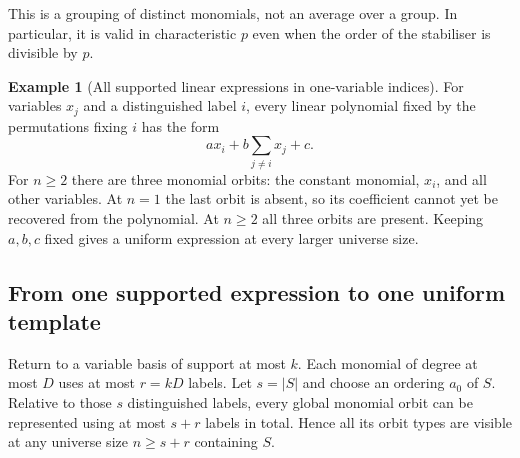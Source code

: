 \documentclass[11pt,a4paper,oneside,openany]{book}
\theoremstyle{definition}\newtheorem{definition}[theorem]{Definition}
\newtheorem{example}[theorem]{Example}
\theoremstyle{remark}\newtheorem{remark}[theorem]{Remark}
\numberwithin{equation}{chapter}
\begin{document}
This is a grouping of distinct monomials, not an average over a group.
In particular, it is valid in characteristic $p$ even when the order
of the stabiliser is divisible by $p$.

\begin{example}[All supported linear expressions in one-variable indices]\label{tx:eg:supported-linear}
For variables $x_j$ and a distinguished label $i$, every linear
polynomial fixed by the permutations fixing $i$ has the form
\[
                    a x_i+b\sum_{j\ne i}x_j+c.
\]
For $n\ge2$ there are three monomial orbits: the constant monomial, $x_i$, and all
other variables. At $n=1$ the last orbit is absent, so its coefficient
cannot yet be recovered from the polynomial. At $n\ge2$ all three
orbits are present. Keeping $a,b,c$ fixed gives a uniform expression
at every larger universe size.
\end{example}

\subsection{From one supported expression to one uniform template}
Return to a variable basis of support at most $k$. Each monomial of
degree at most $D$ uses at most $r=kD$ labels. Let $s=|S|$ and choose
an ordering $a_0$ of $S$. Relative to those $s$ distinguished labels,
every global monomial orbit can be represented using at most $s+r$
labels in total. Hence all its orbit types are visible at any universe size
$n\ge s+r$ containing $S$.
\end{document}
